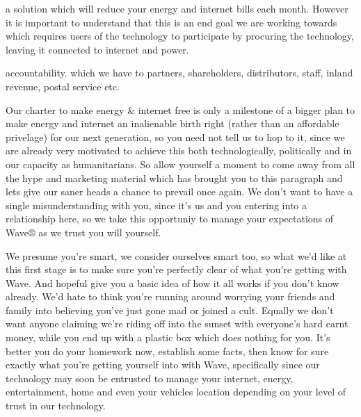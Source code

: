 \documentclass[letterpaper,10pt,english]{sphinxmanual}
\begin{document}
 a solution which will reduce your energy and internet bills each month. However it is important to understand that this is an end goal we are working towards which requires users of the technology to participate by procuring the technology, leaving it connected to internet and power.


 accountability. which we have to partners, shareholders, distributors, staff, inland revenue, postal service etc.



Our charter to make energy \& internet free is only a milestone of a bigger plan to make energy and internet an inalienable birth right (rather than an affordable privelage) for our next generation, so you need not tell us to hop to it, since we are already very motivated to achieve this both technologically, politically and in our capacity as humanitarians. So allow yourself a moment to come away from all the hype and marketing material which has brought you to this paragraph and lets give our saner heads a chance to prevail once again. We don’t want to have a single misunderstanding with you, since it’s us and you entering into a relationship here, so we take this opportuniy to manage your expectations of Wave® as we trust you will yourself.

We presume you’re smart, we consider ourselves smart too, so what we’d like at this first stage is to make sure you’re perfectly clear of what you’re getting with Wave. And hopeful give you a basic idea of how it all works if you don’t know already. We’d hate to think you’re running around worrying your friends and family into believing you’ve just gone mad or joined a cult. Equally we don’t want anyone claiming we’re riding off into the sunset with everyone’s hard earnt money, while you end up with a plastic box which does nothing for you. It’s better you do your homework now, establish some facts, then know for sure exactly what you’re getting yourself into with Wave, specifically since our technology may soon be entrusted to manage your internet, energy, entertainment, home and even your vehicles location depending on your level of trust in our technology.
\end{document}
